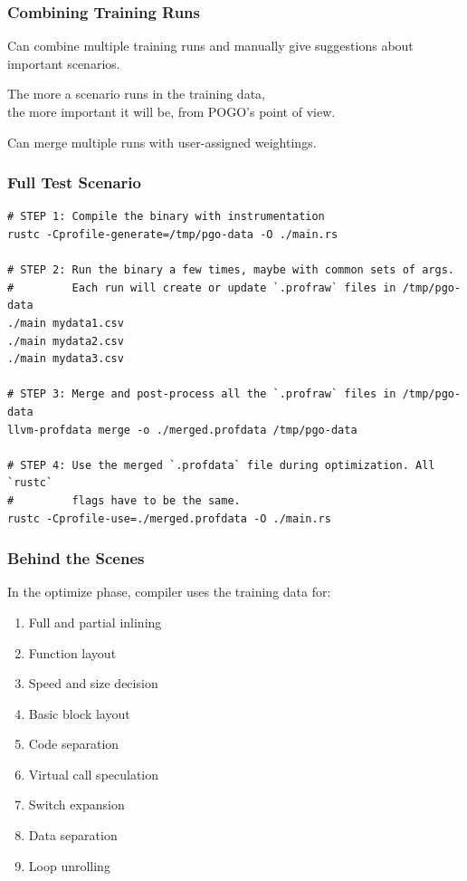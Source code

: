 \begin{frame}
\frametitle{Combining Training Runs}



Can combine multiple training runs and manually give suggestions about important scenarios.

The more a scenario runs in the training data, \\
the more important it will be, from POGO's point of view.

Can merge multiple runs with user-assigned weightings.


\end{frame}


\begin{frame}[fragile]
\frametitle{Full Test Scenario}

{\scriptsize
\begin{verbatim}
# STEP 1: Compile the binary with instrumentation
rustc -Cprofile-generate=/tmp/pgo-data -O ./main.rs

# STEP 2: Run the binary a few times, maybe with common sets of args.
#         Each run will create or update `.profraw` files in /tmp/pgo-data
./main mydata1.csv
./main mydata2.csv
./main mydata3.csv

# STEP 3: Merge and post-process all the `.profraw` files in /tmp/pgo-data
llvm-profdata merge -o ./merged.profdata /tmp/pgo-data

# STEP 4: Use the merged `.profdata` file during optimization. All `rustc`
#         flags have to be the same.
rustc -Cprofile-use=./merged.profdata -O ./main.rs
\end{verbatim}
}

\end{frame}



\begin{frame}
\frametitle{Behind the Scenes}



In the optimize phase, compiler uses the training data for:

\begin{enumerate}
\item Full and partial inlining
\item Function layout
\item Speed and size decision
\item Basic block layout 
\item Code separation
\item Virtual call speculation
\item Switch expansion
\item Data separation
\item Loop unrolling
\end{enumerate}

\end{frame}



